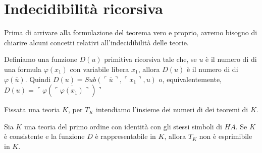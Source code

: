 \section{Indecidibilità ricorsiva}
Prima di arrivare alla formulazione del teorema vero e proprio, 
avremo bisogno di chiarire alcuni concetti relativi all'indecidibilità delle teorie.

\begin{defi}
Definiamo una funzione $D(u)$ primitiva ricorsiva tale che, se $u$ è il numero di \godel
 di una formula $\varphi(x_1)$ con variabile libera $x_1$, allora $D(u)$
è il numero di \godel di $\varphi(\bar{u})$. Quindi $D(u)=Sub(\ulcorner \bar{u} \urcorner , \ulcorner x_1 \urcorner , u)$ o, equivalentemente, $D(u)=\ulcorner \varphi(\overline{\ulcorner \varphi(x_1) \urcorner}) \urcorner $
\end{defi}

\begin{defi}
Fissata una teoria $K$, per $T_K$ intendiamo l'insieme dei numeri di \godel
dei teoremi di $K$.
\end{defi}

\begin{prop}
\label{tkne}
Sia $K$ una teoria del primo ordine con identità con gli stessi simboli di $HA$.
Se $K$ è consistente e la funzione $D$ è rappresentabile in $K$, allora $T_K$ non è
esprimibile in $K$.
\end{prop}


